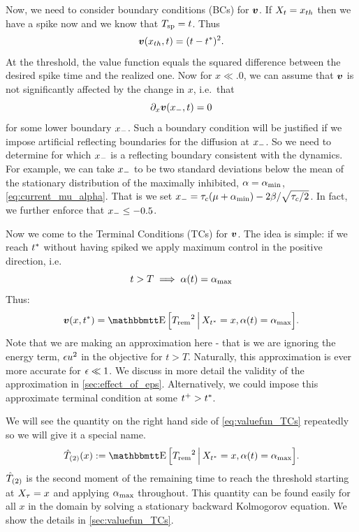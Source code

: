 \documentclass{article}
\begin{document}
Now, we need to consider boundary conditions (BCs) for ${ \boldsymbol{v} }$. If $X_t = { x_{th} }$
then we have a spike now and we know that ${ T_{\textrm{sp} } } = t$. Thus
$$ { \boldsymbol{v} }({ x_{th} },t) =
(t-{ t^* })^2.$$ 
At the threshold, the value function equals the squared difference
between the desired spike time and the realized one.
Now for $x \ll .0$, we can assume that ${ \boldsymbol{v} }$ is not
significantly affected by the change in $x$, i.e.\ that $$ {\partial}_x { \boldsymbol{v} }({ x_{-} }, t) =
0 $$ for some lower boundary ${ x_{-} }$. Such a boundary condition will be
justified if we impose artificial reflecting boundaries for the diffusion at ${ x_{-} }$. So we need to
determine for which ${ x_{-} }$ is a reflecting boundary consistent with the
dynamics. For example, we can take ${ x_{-} }$ to be two standard deviations
below the mean of the stationary distribution of the maximally
inhibited, ${\alpha}={ {\alpha}_{\textrm{min}} }$, \cref{eq:current_mu_alpha}. That is we set ${ x_{-} } =
{ \tau_{c} }(\mu + { {\alpha}_{\textrm{min}} }) - 2 {\beta} / \sqrt{{ \tau_{c} }/2}$. In fact, we further enforce that
${ x_{-} } \leq -0.5$.

Now we come to the Terminal Conditions (TCs) for ${ \boldsymbol{v} }$. The idea is simple:
if we reach ${ t^* }$ without having spiked we apply maximum control in the
positive direction, i.e.\ $$t>T \implies {\alpha}(t) = { {\alpha}_{\textrm{max}} }$$ Thus: 
\begin{equation}\v(x,\T) =
\Exp \Big[\trem^2 \,\Big|\, X_\T = x, \a(t) = \amax \Big].
\label{eq:valuefun_TCs}
\end{equation} 
Note that we are making an approximation here
- that is we are ignoring the energy term, ${\epsilon} u^2$ in the objective for
$t>T$. Naturally, this approximation is ever more accurate for ${\epsilon} \ll 1$.
We discuss in more detail the validity of the approximation in
\cref{sec:effect_of_eps}.
Alternatively, we could impose this approximate terminal condition at some $t^+
> { t^* }$.

We will see the quantity on the right hand side of \cref{eq:valuefun_TCs}
repeatedly so we will give it a special name.
\begin{equation}
\Ttwo(x) := \Exp \Big[\trem^2 \,\Big|\, X_\T = x, \a(t) = \amax \Big].
\label{eq:Trem_squared}
\end{equation} 
${ \hat{T}_{(2)} }$ is the second moment of the remaining time to reach the
threshold starting at $X_{\tau} = x$ and applying ${ {\alpha}_{\textrm{max}} }$ throughout. This quantity can be found
easily for all $x$ in the domain by solving a stationary backward Kolmogorov
equation. We show the details in \cref{sec:valuefun_TCs}.
\end{document}
